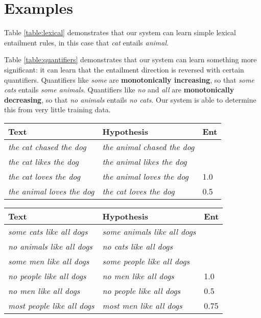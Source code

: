 \documentclass[letterpaper]{article}
\begin{document}
\section{Examples}

Table \ref{table:lexical} demonstrates that our system can learn
simple lexical entailment rules, in this case that \emph{cat} entails
\emph{animal}.

Table \ref{table:quantifiers} demonstrates that our system can learn
something more significant: it can learn that the entailment direction
is reversed with certain quantifiers. Quantifiers like \emph{some} are
\textbf{monotonically increasing}, so that \emph{some cats} entails
\emph{some animals}. Quantifiers like \emph{no} and \emph{all} are
\textbf{monotonically decreasing}, so that \emph{no animals} entails
\emph{no cats}. Our system is able to determine this from very little
training data.

\begin{table*}
\centering
\begin{tabular}{|l|l|l|}
\hline
Text & Hypothesis & Ent\\
\hline
\emph{the cat chased the dog} & \emph{the animal chased the dog} & \\
\emph{the cat likes the dog} & \emph{the animal likes the dog} & \\
\hline
\emph{the cat loves the dog} & \emph{the animal loves the dog} & 1.0\\
\emph{the animal loves the dog} & \emph{the cat loves the dog} & 0.5\\
\hline
\end{tabular}
\caption{Learning lexical entailment from examples, showing training
  data at the top, and test data below, with the degree of entailment
  determined by our system.}
\label{table:lexical}
\end{table*}

\begin{table*}
\centering
\begin{tabular}{|l|l|l|}
\hline
Text & Hypothesis & Ent\\
\hline
\emph{some cats like all dogs} & \emph{some animals like all dogs} & \\
\emph{no animals like all dogs} & \emph{no cats like all dogs} & \\
\emph{some men like all dogs} & \emph{some people like all dogs} & \\
\hline
\emph{no people like all dogs} & \emph{no men like all dogs} & 1.0\\
\emph{no men like all dogs} & \emph{no people like all dogs} & 0.5\\
\emph{most people like all dogs} & \emph{most men like all dogs} & 0.75\\
\hline
\end{tabular}
\caption{Learning how quantifiers reverse the entailment direction,
  with training data at the top, and test data below, with the degree
  of entailment determined by our system.}
\label{table:quantifiers}
\end{table*}
\end{document}
